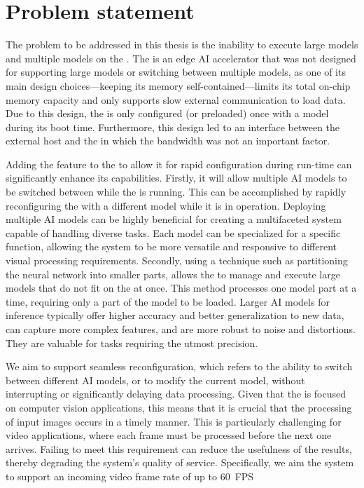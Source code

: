 \section{Problem statement}
The problem to be addressed in this thesis is the inability to execute large models and multiple models on the \graicore{}.
The \graicore{} is an edge AI accelerator that was not designed for supporting large models or switching between multiple models, as one of its main design choices---keeping its memory self-contained---limits its total on-chip memory capacity and only supports slow external communication to load data.
Due to this design, the \graicore{} is only configured (or preloaded) once with a model during its boot time.
Furthermore, this design led to an interface between the external host and the \graicore{} in which the bandwidth was not an important factor.

Adding the feature to the \graicore{} to allow it for rapid configuration during run-time can significantly enhance its capabilities.
Firstly, it will allow multiple AI models to be switched between while the \graicore{} is running.
This can be accomplished by rapidly reconfiguring the \graicore{} with a different model while it is in operation.
Deploying multiple AI models can be highly beneficial for creating a multifaceted system capable of handling diverse tasks.
Each model can be specialized for a specific function, allowing the system to be more versatile and responsive to different visual processing requirements.
Secondly, using a technique such as partitioning the neural network into smaller parts, allows the \graicore{} to manage and execute large models that do not fit on the \graicore{} at once.
This method processes one model part at a time, requiring only a part of the model to be loaded.
Larger AI models for inference typically offer higher accuracy and better generalization to new data, can capture more complex features, and are more robust to noise and distortions.
They are valuable for tasks requiring the utmost precision.

We aim to support seamless reconfiguration, which refers to the ability to switch between different AI models, or to modify the current model, without interrupting or significantly delaying data processing.
Given that the \graicore{} is focused on computer vision applications, this means that it is crucial that the processing of input images occurs in a timely manner.
This is particularly challenging for video applications, where each frame must be processed before the next one arrives.
Failing to meet this requirement can reduce the usefulness of the results, thereby degrading the system's quality of service.
Specifically, we aim the system to support an incoming video frame rate of up to \SI{60}{FPS}

